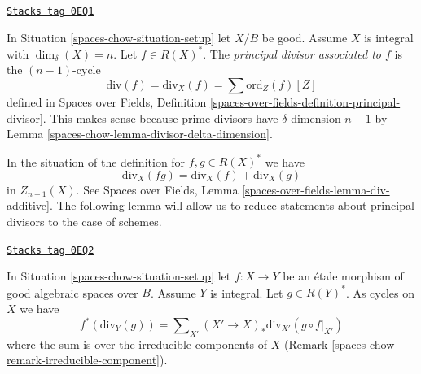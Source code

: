 \begin{definition}
\label{spaces-chow-definition-principal-divisor}
\href{https://stacks.math.columbia.edu/tag/0EQ1}{\texttt{Stacks tag 0EQ1}}

In Situation \ref{spaces-chow-situation-setup} let $X/B$ be good. Assume $X$ is
integral with $\dim_\delta(X) = n$.
Let $f \in R(X)^*$. The {\it principal divisor associated to $f$}
is the $(n - 1)$-cycle
$$
\text{div}(f) = \text{div}_X(f) = \sum \text{ord}_Z(f) [Z]
$$
defined in Spaces over Fields, Definition
\ref{spaces-over-fields-definition-principal-divisor}.
This makes sense because prime divisors have $\delta$-dimension $n - 1$ by
Lemma \ref{spaces-chow-lemma-divisor-delta-dimension}.
\end{definition}

In the situation of the definition for $f, g \in R(X)^*$ we have
$$
\text{div}_X(fg) = \text{div}_X(f) + \text{div}_X(g)
$$
in $Z_{n - 1}(X)$. See Spaces over Fields, Lemma
\ref{spaces-over-fields-lemma-div-additive}.
The following lemma will allow us to reduce
statements about principal divisors to the case of schemes.

\begin{lemma}
\label{spaces-chow-lemma-etale-pullback-principal-divisor}
\href{https://stacks.math.columbia.edu/tag/0EQ2}{\texttt{Stacks tag 0EQ2}}

In Situation \ref{spaces-chow-situation-setup} let $f : X \to Y$ be an \'etale
morphism of good algebraic spaces over $B$. Assume $Y$ is integral.
Let $g \in R(Y)^*$. As cycles on $X$ we have
$$
f^*(\text{div}_Y(g)) =
\sum\nolimits_{X'} (X' \to X)_*\text{div}_{X'}(g \circ f|_{X'})
$$
where the sum is over the irreducible components of $X$
(Remark \ref{spaces-chow-remark-irreducible-component}).
\end{lemma}

